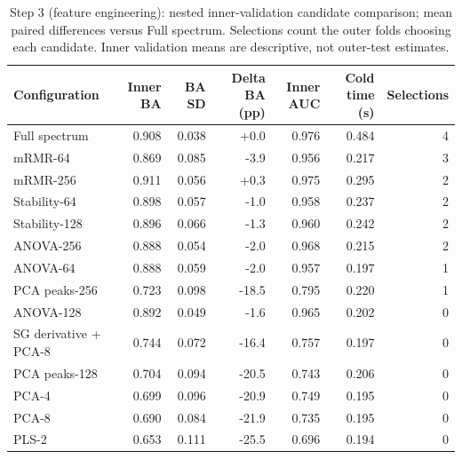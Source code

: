 \begin{table}[t]
\centering
\caption{Step 3 (feature engineering): nested inner-validation candidate comparison; mean paired differences versus Full spectrum. Selections count the outer folds choosing each candidate. Inner validation means are descriptive, not outer-test estimates.}
\label{tab:step3_candidates}
\footnotesize
\setlength{\tabcolsep}{4pt}
\begin{tabular}{lrrrrrr}
\toprule
Configuration & Inner BA & BA SD & Delta BA (pp) & Inner AUC & Cold time (s) & Selections \\
\midrule
Full spectrum & 0.908 & 0.038 & +0.0 & 0.976 & 0.484 & 4 \\
mRMR-64 & 0.869 & 0.085 & -3.9 & 0.956 & 0.217 & 3 \\
mRMR-256 & 0.911 & 0.056 & +0.3 & 0.975 & 0.295 & 2 \\
Stability-64 & 0.898 & 0.057 & -1.0 & 0.958 & 0.237 & 2 \\
Stability-128 & 0.896 & 0.066 & -1.3 & 0.960 & 0.242 & 2 \\
ANOVA-256 & 0.888 & 0.054 & -2.0 & 0.968 & 0.215 & 2 \\
ANOVA-64 & 0.888 & 0.059 & -2.0 & 0.957 & 0.197 & 1 \\
PCA peaks-256 & 0.723 & 0.098 & -18.5 & 0.795 & 0.220 & 1 \\
ANOVA-128 & 0.892 & 0.049 & -1.6 & 0.965 & 0.202 & 0 \\
SG derivative + PCA-8 & 0.744 & 0.072 & -16.4 & 0.757 & 0.197 & 0 \\
PCA peaks-128 & 0.704 & 0.094 & -20.5 & 0.743 & 0.206 & 0 \\
PCA-4 & 0.699 & 0.096 & -20.9 & 0.749 & 0.195 & 0 \\
PCA-8 & 0.690 & 0.084 & -21.9 & 0.735 & 0.195 & 0 \\
PLS-2 & 0.653 & 0.111 & -25.5 & 0.696 & 0.194 & 0 \\
\bottomrule
\end{tabular}
\end{table}
